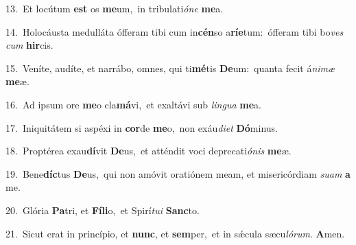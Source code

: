 {\numbfont\textcolor{\numbcolor}{13.}}~Et locútum \textbf{est} os \textbf{me}\-um,~\star in tribulati\-\textit{ó}\-\textit{ne} \textbf{me}\-a.\par
{\numbfont\textcolor{\numbcolor}{14.}}~Holocáusta medulláta ófferam tibi cum in\-\textbf{cén}\-so a\-\textbf{rí}\-\textbf{e}tum:~\star ófferam tibi bo\textit{ves} \textit{cum} \textbf{hir}\-cis.\par
{\numbfont\textcolor{\numbcolor}{15.}}~Veníte, audíte, et narrábo, omnes, qui ti\-\textbf{mé}\-tis \textbf{De}\-um:~\star quanta fecit á\-\textit{ni}\-\textit{mæ} \textbf{me}\-æ.\par
{\numbfont\textcolor{\numbcolor}{16.}}~Ad ipsum ore \textbf{me}\-o cla\-\textbf{má}\-vi,~\star et exaltávi sub \textit{lin}\-\textit{gua} \textbf{me}\-a.\par
{\numbfont\textcolor{\numbcolor}{17.}}~Iniquitátem si aspéxi in \textbf{cor}\-de \textbf{me}\-o,~\star non exáu\-\textit{di}\-\textit{et} \textbf{Dó}\-minus.\par
{\numbfont\textcolor{\numbcolor}{18.}}~Proptérea exau\-\textbf{dí}\-vit \textbf{De}\-us,~\star et atténdit voci deprecati\-\textit{ó}\-\textit{nis} \textbf{me}\-æ.\par
{\numbfont\textcolor{\numbcolor}{19.}}~Bene\-\textbf{díc}\-tus \textbf{De}\-us,~\star qui non amóvit oratiónem meam, et misericórdiam \textit{su}\-\textit{am} \textbf{a} me.\par
{\numbfont\textcolor{\numbcolor}{20.}}~Glória \textbf{Pa}\-tri, et \textbf{Fí}\-\textbf{li}o,~\star et Spirí\-\textit{tu}\-\textit{i} \textbf{Sanc}\-to.\par
{\numbfont\textcolor{\numbcolor}{21.}}~Sicut erat in princípio, et \textbf{nunc}\-, et \textbf{sem}\-per,~\star et in sǽcula sæcu\-\textit{ló}\-\textit{rum}. \textbf{A}\-men.\par
